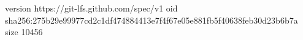 version https://git-lfs.github.com/spec/v1
oid sha256:275b29e99977cd2c1df474884413e7f4f67e05e881fb5f40638feb30d23b6b7a
size 10456
